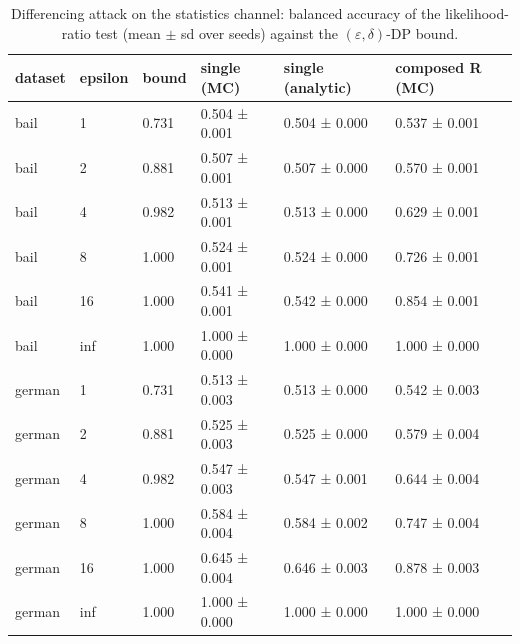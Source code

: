\begin{table}[t]
\centering
\small
\caption{Differencing attack on the statistics channel: balanced accuracy of the likelihood-ratio test (mean $\pm$ sd over seeds) against the $(\varepsilon,\delta)$-DP bound.}
\begin{tabular}{llllll}
\toprule
dataset & epsilon & bound & single (MC) & single (analytic) & composed R (MC) \\
\midrule
bail & 1 & 0.731 & 0.504 ± 0.001 & 0.504 ± 0.000 & 0.537 ± 0.001 \\
bail & 2 & 0.881 & 0.507 ± 0.001 & 0.507 ± 0.000 & 0.570 ± 0.001 \\
bail & 4 & 0.982 & 0.513 ± 0.001 & 0.513 ± 0.000 & 0.629 ± 0.001 \\
bail & 8 & 1.000 & 0.524 ± 0.001 & 0.524 ± 0.000 & 0.726 ± 0.001 \\
bail & 16 & 1.000 & 0.541 ± 0.001 & 0.542 ± 0.000 & 0.854 ± 0.001 \\
bail & inf & 1.000 & 1.000 ± 0.000 & 1.000 ± 0.000 & 1.000 ± 0.000 \\
german & 1 & 0.731 & 0.513 ± 0.003 & 0.513 ± 0.000 & 0.542 ± 0.003 \\
german & 2 & 0.881 & 0.525 ± 0.003 & 0.525 ± 0.000 & 0.579 ± 0.004 \\
german & 4 & 0.982 & 0.547 ± 0.003 & 0.547 ± 0.001 & 0.644 ± 0.004 \\
german & 8 & 1.000 & 0.584 ± 0.004 & 0.584 ± 0.002 & 0.747 ± 0.004 \\
german & 16 & 1.000 & 0.645 ± 0.004 & 0.646 ± 0.003 & 0.878 ± 0.003 \\
german & inf & 1.000 & 1.000 ± 0.000 & 1.000 ± 0.000 & 1.000 ± 0.000 \\
\bottomrule
\end{tabular}
\label{tab:privacy_attack}
\end{table}
